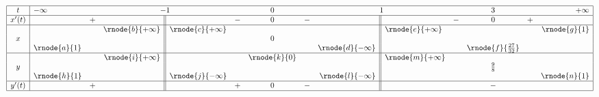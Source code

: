 \documentclass[12pt,a4paper]{article}
\begin{document}
$$\begin{array}{|c|lcr||lcccr||lcccr|}
\hline
t&-\infty& &\multicolumn{2}{c}{-1}& &0& &\multicolumn{2}{c}{1}& &3& &+\infty\\
\hline
x'(t)& &+& & &-&0&-& & &-&0&+& \\
\hline
 & & &\rnode{b}{+\infty}&\rnode{c}{+\infty}& & & & &\rnode{e}{+\infty}& & & &\rnode{g}{1}\\
x& & & & & &0& & & & & & & \\
 &\rnode{a}{1}& & & & & & &\rnode{d}{-\infty}& & &\rnode{f}{\frac{27}{32}}& & \\
\hline
 & & &\rnode{i}{+\infty}& & &\rnode{k}{0}& & &\rnode{m}{+\infty}& & & & \\
y& & & & & & & & & & &\frac{9}{8}& & \\
 &\rnode{h}{1}& & &\rnode{j}{-\infty}& & & &\rnode{l}{-\infty}& & & & &\rnode{n}{1}\\
\hline
y'(t)& &+& & &+&0&-& & & &-& & \\
\hline
\end{array}
$$

\end{document}
